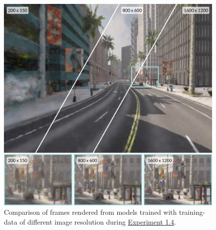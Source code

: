 \begin{figure}[ht]
    \centering
    \includegraphics[width=1.0\textwidth]{figures/image-size-comparison-details.png}
    \caption[Impact of training data's image resolution on the resulting NeRF]{Comparison of frames rendered from models trained with training-data of different image resolution during \hyperref[sec:exp-image-resolution]{Experiment 1.4}.}
    \label{fig:image-size-comparison}
\end{figure}
